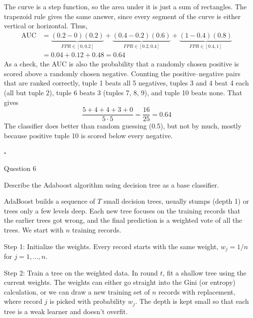 \documentclass[12pt,letterpaper, onecolumn]{exam}
\begin{document}
\begin{questions}
\begin{solution}
            The curve is a step function, so the area under it is just a sum of rectangles. The trapezoid rule gives the same answer, since every segment of the curve is either vertical or horizontal. Thus,
            \begin{align*}
                \text{AUC} &= \underbrace{(0.2-0)(0.2)}_{FPR\in[0,0.2]} + \underbrace{(0.4-0.2)(0.6)}_{FPR\in[0.2,0.4]} + \underbrace{(1-0.4)(0.8)}_{FPR\in[0.4,1]}\\
                &= 0.04 + 0.12 + 0.48 = 0.64
            \end{align*}
            As a check, the AUC is also the probability that a randomly chosen positive is scored above a randomly chosen negative. Counting the positive--negative pairs that are ranked correctly, tuple 1 beats all 5 negatives, tuples 3 and 4 beat 4 each (all but tuple 2), tuple 6 beats 3 (tuples 7, 8, 9), and tuple 10 beats none. That gives
            \begin{equation*}
                \frac{5+4+4+3+0}{5\cdot 5} = \frac{16}{25} = 0.64
            \end{equation*}
            The classifier does better than random guessing (0.5), but not by much, mostly because positive tuple 10 is scored below every negative.

        $\square$
    \end{solution}

    \newpage
    \question[10] Question 6\droppoints

    Describe the Adaboost algorithm using decision tree as a base classifier.

    \begin{solution}

        AdaBoost builds a sequence of $T$ small decision trees, usually stumps (depth 1) or trees only a few levels deep. Each new tree focuses on the training records that the earlier trees got wrong, and the final prediction is a weighted vote of all the trees. We start with $n$ training records.

        Step 1: Initialize the weights. Every record starts with the same weight, $w_j = 1/n$ for $j=1,\dots,n$.

        Step 2: Train a tree on the weighted data. In round $t$, fit a shallow tree using the current weights. The weights can either go straight into the Gini (or entropy) calculation, or we can draw a new training set of $n$ records with replacement, where record $j$ is picked with probability $w_j$. The depth is kept small so that each tree is a weak learner and doesn't overfit.


\end{solution}
\end{questions}
\end{document}
